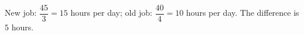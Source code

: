 New job: $\dfrac{45}{3}=15$ hours per day; old job: $\dfrac{40}{4}=10$ hours per day. The difference is $\boxed{5}$ hours.
